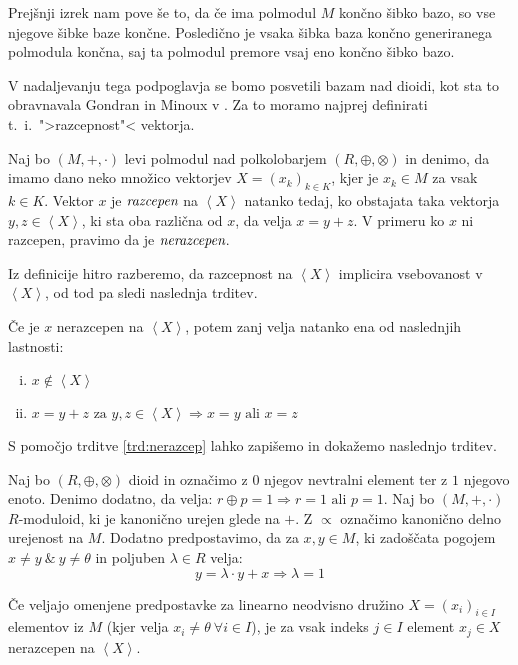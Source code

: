 \documentclass[mat1]{fmfdelo}
\newcommand{\pojem}[1]{\ensuremath{\emph{#1}}}
\newcommand{\Gen}[1]{\ensuremath{\left<{#1}\right>}}
\begin{document}
	Prejšnji izrek nam pove še to, da če ima polmodul $M$ končno šibko bazo, so vse njegove šibke baze končne. Posledično je vsaka šibka baza končno generiranega polmodula končna, saj ta polmodul premore vsaj eno končno šibko bazo.

V nadaljevanju tega podpoglavja se bomo posvetili bazam nad dioidi, kot sta to obravnavala Gondran in Minoux v \cite[poglavje 5.\,2.\,5.\,]{bib:Gondran}. Za to moramo najprej definirati t.~i.\  ">razcepnost"< vektorja.
\begin{definicija}
	Naj bo $(M, +,\cdot)$ levi polmodul nad polkolobarjem $(R, \oplus, \otimes)$ in denimo, da imamo dano neko množico vektorjev $X = (x_k)_{k\in K}$, kjer je $x_k\in M$ za vsak $k\in K$. Vektor $x$ je \pojem{razcepen} na \Gen{X} natanko tedaj, ko obstajata taka vektorja $y, z\in \Gen{X}$, ki sta oba različna od $x$, da velja $x = y + z$. V primeru ko $x$ ni razcepen, pravimo da je \pojem{nerazcepen}.
\end{definicija}

Iz definicije hitro razberemo, da razcepnost na \Gen{X} implicira vsebovanost v \Gen{X}, od tod pa sledi naslednja trditev.
	
\begin{trditev}
	\label{trd:nerazcep}
	Če je $x$ nerazcepen na \Gen{X}, potem zanj velja natanko ena od naslednjih lastnosti:
	\begin{enumerate}[(i)] 
		\item $x \notin \Gen{X}$
		\item $x = y + z \text{~za~} y, z\in\Gen{X}\Rightarrow x = y \text{~ali~} x = z$
	\end{enumerate}
\end{trditev}

S pomočjo trditve \ref{trd:nerazcep} lahko zapišemo in dokažemo naslednjo trditev.

\begin{trditev}
	\label{trd:potrebzanerazcep}
	Naj bo $(R, \oplus, \otimes)$ dioid in označimo z $0$ njegov nevtralni element ter z $1$ njegovo enoto. Denimo dodatno, da velja: $r\oplus p = 1 \Rightarrow r = 1 \text{~ali~} p=1$. 
	Naj bo $(M, +, \cdot)$ $R$-moduloid, ki je kanonično urejen glede na $+$. Z $\varpropto$ označimo kanonično delno urejenost na $M$. Dodatno predpostavimo, da za $x, y\in M$, ki zadoščata pogojem $x \neq y ~\&~ y\neq\theta$ in poljuben $\lambda\in R$ velja: $$y = \lambda\cdot y + x \Rightarrow \lambda = 1$$
	
	Če veljajo omenjene predpostavke za linearno neodvisno družino $X = (x_i)_{i\in I}$ elementov iz $M$ (kjer velja $x_i \neq \theta~\forall i\in I$), je za vsak indeks $j\in I$ element $x_j\in X$ nerazcepen na \Gen{X}.
\end{trditev}
\end{document}
